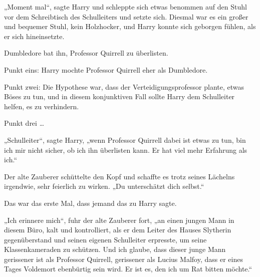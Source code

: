 „Moment mal“, sagte Harry und schleppte sich etwas benommen auf den Stuhl vor dem Schreibtisch des Schulleiters und setzte sich. Diesmal war es ein großer und bequemer Stuhl, kein Holzhocker, und Harry konnte sich geborgen fühlen, als er sich hineinsetzte.

Dumbledore bat ihn, Professor Quirrell zu überlisten.

Punkt eins: Harry mochte Professor Quirrell eher als Dumbledore.

Punkt zwei: Die Hypothese war, dass der Verteidigungsprofessor plante, etwas Böses zu tun, und in diesem konjunktiven Fall sollte Harry dem Schulleiter helfen, es zu verhindern.

Punkt drei …

„Schulleiter“, sagte Harry, „wenn Professor Quirrell dabei ist etwas zu tun, bin ich mir nicht sicher, ob ich ihn überlisten kann. Er hat viel mehr Erfahrung als ich.“

Der alte Zauberer schüttelte den Kopf und schaffte es trotz seines Lächelns irgendwie, sehr feierlich zu wirken.
„Du unterschätzt dich selbst.“

Das war das erste Mal, dass jemand das zu Harry sagte.

„Ich erinnere mich“, fuhr der alte Zauberer fort, „an einen jungen Mann in diesem Büro, kalt und kontrolliert, als er dem Leiter des Hauses Slytherin gegenüberstand und seinen eigenen Schulleiter erpresste, um seine Klassenkameraden zu schützen. Und ich glaube, dass dieser junge Mann gerissener ist als Professor Quirrell, gerissener als Lucius Malfoy, dass er eines Tages Voldemort ebenbürtig sein wird. Er ist es, den ich um Rat bitten möchte.“

